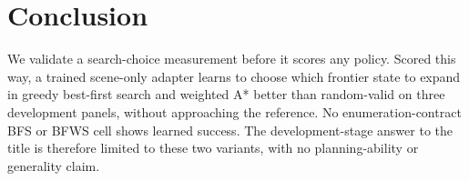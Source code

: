 \section{Conclusion}
\label{sec:conclusion}

We validate a search-choice measurement before it scores any policy. Scored this way, a trained scene-only adapter learns to choose which frontier state to expand in greedy best-first search and weighted A* better than random-valid on three development panels, without approaching the reference.
No enumeration-contract BFS or BFWS cell shows learned success. The development-stage answer to the title is therefore limited to these two variants, with no planning-ability or generality claim.
